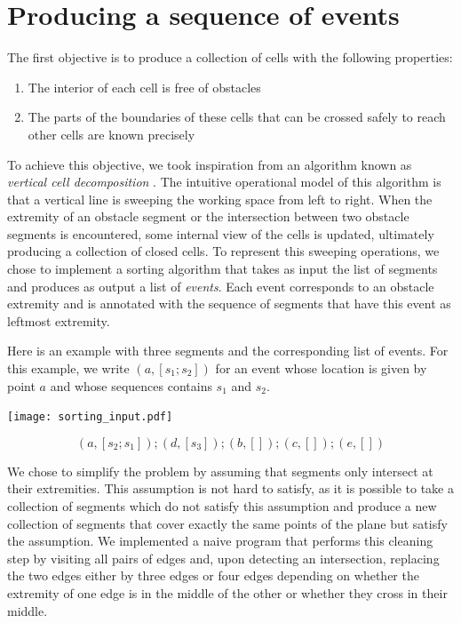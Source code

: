 \documentclass{easychair}
\begin{document}
\section{Producing a sequence of events}
The first objective is to produce a collection of cells with the following
properties:
\begin{enumerate}
\item The interior of each cell is free of obstacles
\item The parts of the boundaries of these cells that can be crossed
  safely to reach other cells are known precisely
\end{enumerate}
To achieve this objective, we took inspiration from an algorithm known as
{\em vertical cell decomposition} \cite{Latombe91}.  The intuitive
operational model of this algorithm is that a vertical line is
sweeping the working space from left to right.  When the extremity of
an obstacle segment or the intersection between two obstacle segments
is encountered, some internal view of the cells is updated, ultimately
producing a collection of closed cells.  To represent this sweeping
operations, we chose to implement a sorting algorithm that takes as
input the list of segments and produces as output a list of {\em
  events}.  Each event corresponds to an obstacle extremity and is
annotated with the sequence of segments that have this event as
leftmost extremity.

Here is an example with three segments and the corresponding list of events.
For this example, we write \((a, [s_1;s_2])\) for an event whose location is
given by point \(a\) and whose sequences contains \(s_1\) and \(s_2\).

\begin{center}
\texttt{[image: sorting\_input.pdf]}
\end{center}
\[ (a, [s_2; s_1]); (d, [s_3]); (b, []); (c, []); (e,[])\]

We chose to simplify the problem by assuming that segments only
intersect at their extremities.  This assumption is not hard to
satisfy, as it is possible to take a collection of segments which do
not satisfy this assumption and produce a new collection of segments
that cover exactly the same points of the plane but satisfy the
assumption.  We implemented a naive program that performs this cleaning
step by visiting all pairs of edges and, upon detecting an
intersection, replacing the two edges either by three edges or four
edges depending on whether the extremity of one edge is in the middle
of the other or whether they cross in their middle.
\end{document}
